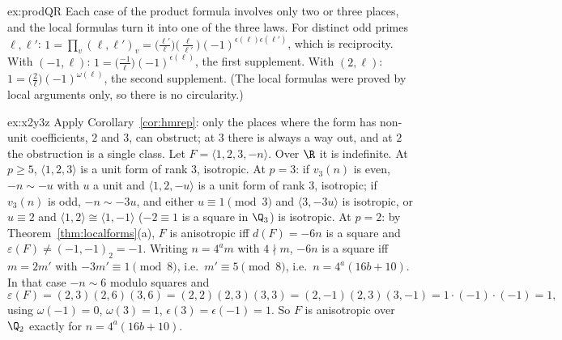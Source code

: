 \begin{solution}{ex:prodQR}
\idea Each case of the product formula involves only two or three places, and the local formulas turn it into one of the three
laws.
\writeup For distinct odd primes $\ell,\ell'$: $1=\prod_v(\ell,\ell')_v=\bigl(\frac{\ell'}\ell\bigr)\bigl(\frac\ell{\ell'}\bigr)
(-1)^{\epsilon(\ell)\epsilon(\ell')}$, which is reciprocity. With $(-1,\ell)$: $1=\bigl(\frac{-1}\ell\bigr)(-1)^{\epsilon(\ell)}$, the
first supplement. With $(2,\ell)$: $1=\bigl(\frac2\ell\bigr)(-1)^{\omega(\ell)}$, the second supplement. (The local formulas were
proved by local arguments only, so there is no circularity.)
\end{solution}

\begin{solution}{ex:x2y3z}
\idea Apply Corollary~\ref{cor:hmrep}: only the places where the form has non-unit coefficients, $2$ and $3$, can obstruct; at $3$
there is always a way out, and at $2$ the obstruction is a single class.
\writeup Let $F=\langle1,2,3,-n\rangle$. Over $\R$ it is indefinite. At $p\ge5$, $\langle1,2,3\rangle$ is a unit form of rank $3$, isotropic.
At $p=3$: if $v_3(n)$ is even, $-n\sim-u$ with $u$ a unit and $\langle1,2,-u\rangle$ is a unit form of rank $3$, isotropic; if $v_3(n)$
is odd, $-n\sim-3u$, and either $u\equiv1\pmod3$ and $\langle3,-3u\rangle$ is isotropic, or $u\equiv2$ and $\langle1,2\rangle\cong
\langle1,-1\rangle$ ($-2\equiv1$ is a square in $\Q_3$) is isotropic. At $p=2$: by Theorem~\ref{thm:localforms}(a), $F$ is anisotropic
iff $d(F)=-6n$ is a square and $\varepsilon(F)\ne(-1,-1)_2=-1$. Writing $n=4^am$ with $4\nmid m$, $-6n$ is a square iff $m=2m'$ with
$-3m'\equiv1\pmod8$, i.e.\ $m'\equiv5\pmod8$, i.e.\ $n=4^a(16b+10)$. In that case $-n\sim6$ modulo squares and
\[
\varepsilon(F)=(2,3)(2,6)(3,6)=(2,2)(2,3)(3,3)=(2,-1)(2,3)(3,-1)=1\cdot(-1)\cdot(-1)=1,
\]
using $\omega(-1)=0$, $\omega(3)=1$, $\epsilon(3)=\epsilon(-1)=1$. So $F$ is anisotropic over $\Q_2$ exactly for $n=4^a(16b+10)$.
\end{solution}

